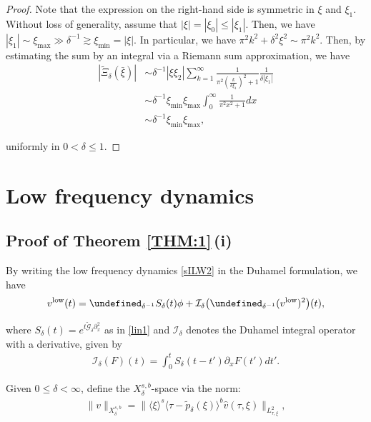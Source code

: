 \documentclass[letterpaper, 11pt,  reqno]{amsart}
\newcommand{\1}{\hspace{0.5mm}\textup{I}\hspace{0.5mm}}
\newcommand{\I}{\mathcal{I}}
\newcommand{\noi}{\noindent}
\let\P= \undefined
\newcommand{\P}{\mathbf{P}}
\newcommand{\low}{\textup{low}}
\newcommand{\dl}{\delta}
\newcommand{\ft}{\widehat}
\newcommand{\wt}{\widetilde}
\newcommand{\dx}{\partial_x}
\newcommand{\Gd}{\wt{\mathcal{G}}_\dl}
\newcommand{\ges}{\gtrsim}
\newcommand{\jb}[1]
{\langle #1 \rangle}
\numberwithin{equation}{section}
\numberwithin{theorem}{section}
\begin{document}
\begin{proof}
\noi
Note that the expression on the right-hand side is symmetric in $\xi$ and $\xi_1$.
Without loss of generality, assume that $|\xi| = |\xi_0| \le |\xi_1|$.
Then, we have $|\xi_1| \sim \xi_{\max}
\gg \dl^{-1} \ges \xi_{\min} = |\xi|$. 
In particular, we have 
$\pi^2k^2  +\dl^2\xi^2 \sim \pi^2 k^2$.
Then, by  estimating
the sum  by an integral via a Riemann sum approximation, we have 
\begin{align*}
|\wt \Xi_\dl(\bar \xi)|
& \sim \dl^{-1} |\xi  \xi_2|
 \sum_{k=1}^{\infty}   
 \frac{ 1}
 {\pi^2(\frac k{\dl \xi_1})^2  +1} \frac{1}{\dl |\xi_1|}\\
 & \sim 
    \dl^{-1} \xi_{\min}\xi_{\max}
\int_{0}^\infty
 \frac{ 1}
 {\pi^2x^2 +1}dx\\
& \sim    \dl^{-1} \xi_{\min}\xi_{\max}, 
\end{align*}

\noi
uniformly in $0 < \dl \le 1$.
\end{proof}


\section{Low frequency dynamics}
\label{SEC:low}









\subsection{Proof of Theorem \ref{THM:1}\,(i)}
\label{SUBSEC:low1}



By writing the low frequency dynamics \eqref{sILW2} in the Duhamel formulation, we have
\begin{align}
v^\low(t) =  \P_{ \dl^{-1}} S_\dl(t) \phi
+ \I_\dl\big(  \P_{ \dl^{-1}} (v^\low)^2 \big)(t), 
\label{sILW4}
\end{align}



\noi
where 
 $S_\dl(t) = e^{ t \Gd \dx^2}$
 as in \eqref{lin1}
and
$\I_\dl$ denotes the Duhamel integral operator 
with a derivative, 
given by 
\begin{align}
\I_\dl(F)(t) = \int_0^t S_\dl(t - t') \dx F(t') dt'.
\label{sILW4a}
\end{align}



Given $0 \le \dl < \infty$, 
define the $X^{s, b}_\dl$-space via the norm:
\begin{align}
\|v \|_{X^{s, b}_\dl} = 
\|\jb{\xi}^s \jb{\tau - \wt p_\dl(\xi)}^b \ft v(\tau, \xi)\|_{L^2_{\tau, \xi}}, 
\label{Xsb1}
\end{align}
\end{document}
